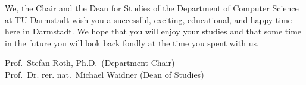 {    We, the Chair and the Dean for Studies of the Department of Computer Science at TU Darmstadt wish you a successful, exciting, educational, and happy time here in Darmstadt.
    We hope that you will enjoy your studies and that some time in the future you will look back fondly at the time you spent with us.

}{Prof.~Stefan Roth, Ph.D.~(Department Chair)\\ Prof.~Dr. rer. nat.~Michael Waidner (Dean of Studies)}
